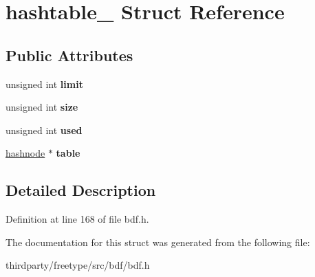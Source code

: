 \hypertarget{structhashtable__}{}\section{hashtable\+\_\+ Struct Reference}
\label{structhashtable__}
\subsection*{Public Attributes}
\begin{DoxyCompactItemize}
\item 
\mbox{\label{structhashtable___aa18bd0ecbd40d3662d33f4111e6a8a60}} 
unsigned int {\bfseries limit}
\item 
\mbox{\label{structhashtable___a1057a4610128ff4309e7c0684b44b16c}} 
unsigned int {\bfseries size}
\item 
\mbox{\label{structhashtable___a80615d23432d37d21519f8182caafdb2}} 
unsigned int {\bfseries used}
\item 
\mbox{\label{structhashtable___a54a497ef20d8da1e185e0583f327c9d4}} 
\hyperlink{struct__hashnode__}{hashnode} $\ast$ {\bfseries table}
\end{DoxyCompactItemize}


\subsection{Detailed Description}


Definition at line 168 of file bdf.\+h.



The documentation for this struct was generated from the following file\+:\begin{DoxyCompactItemize}
\item 
thirdparty/freetype/src/bdf/bdf.\+h\end{DoxyCompactItemize}
